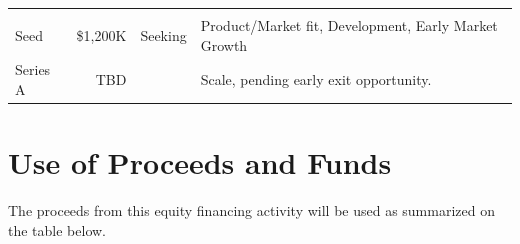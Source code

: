 \documentclass[11pt,openany]{book}
\begin{document}
\begin{longtable}[]{@{}lrcl@{}}
\begin{minipage}[t]{0.55\columnwidth}
\end{minipage}\tabularnewline
\begin{minipage}[t]{0.13\columnwidth}\raggedright
Seed\strut
\end{minipage} & \begin{minipage}[t]{0.10\columnwidth}\raggedleft
\$1,200K\strut
\end{minipage} & \begin{minipage}[t]{0.10\columnwidth}\centering
Seeking\strut
\end{minipage} & \begin{minipage}[t]{0.55\columnwidth}\raggedright
Product/Market fit, Development, Early Market Growth\strut
\end{minipage}\tabularnewline
\begin{minipage}[t]{0.13\columnwidth}\raggedright
Series A\strut
\end{minipage} & \begin{minipage}[t]{0.10\columnwidth}\raggedleft
TBD\strut
\end{minipage} & \begin{minipage}[t]{0.10\columnwidth}\centering
\strut
\end{minipage} & \begin{minipage}[t]{0.55\columnwidth}\raggedright
Scale, pending early exit opportunity.\strut
\end{minipage}\tabularnewline
\bottomrule
\end{longtable}

\hypertarget{use-of-proceeds-and-funds}{%
\section{Use of Proceeds and Funds}\label{use-of-proceeds-and-funds}}

The proceeds from this equity financing activity will be used as
summarized on the table below.
\end{document}
